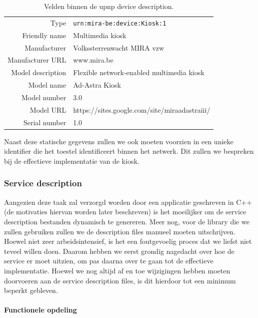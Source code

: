 \begin{table}[h!]
  \begin{center}
    \begin{tabular}{r l}
    \hline
    Type & \texttt{urn:mira-be:device:Kiosk:1} \\
    Friendly name & Multimedia kiosk \\
    Manufacturer & Volkssterrenwacht MIRA vzw \\
    Manufacturer URL & www.mira.be \\
    Model description & Flexible network-enabled multimedia kiosk \\
    Model name & Ad-Astra Kiosk \\
    Model number & 3.0 \\
    Model URL & https://sites.google.com/site/miraadastraiii/ \\
    Serial number & 1.0 \\
    \hline
    \end{tabular}
  \end{center}
  \caption{Velden binnen de \ac{upnp} device description.}
\end{table}

Naast deze statische gegevens zullen we ook moeten voorzien in een unieke identifier die het toestel identificeert binnen het netwerk. Dit zullen we bespreken bij de effectieve implementatie van de kiosk.

\subsubsection{Service description}

Aangezien deze taak zal verzorgd worden door een applicatie geschreven in C++ (de motivaties hiervan worden later beschreven) is het moeilijker om de service description bestanden dynamisch te genereren. Meer nog, voor de library die we zullen gebruiken zullen we de description files manueel moeten uitschrijven. Hoewel niet zeer arbeidsintensief, is het een foutgevoelig proces dat we liefst niet teveel willen doen. Daarom hebben we eerst grondig nagedacht over hoe de service er moet uitzien, om pas daarna over te gaan tot de effectieve implementatie. Hoewel we nog altijd af en toe wijzigingen hebben moeten doorvoeren aan de service description files, is dit hierdoor tot een minimum beperkt gebleven.

\paragraph{Functionele opdeling}


